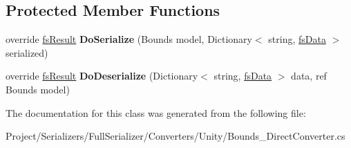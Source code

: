 \subsection*{Protected Member Functions}
\begin{DoxyCompactItemize}
\item 
\mbox{\label{class_full_serializer_1_1_internal_1_1_direct_converters_1_1_bounds___direct_converter_acdba107944e59d9620b06e224c51baf0}} 
override \hyperlink{struct_full_serializer_1_1fs_result}{fs\+Result} {\bfseries Do\+Serialize} (Bounds model, Dictionary$<$ string, \hyperlink{class_full_serializer_1_1fs_data}{fs\+Data} $>$ serialized)
\item 
\mbox{\label{class_full_serializer_1_1_internal_1_1_direct_converters_1_1_bounds___direct_converter_a2d4d2290cff048bd14274876f4814afe}} 
override \hyperlink{struct_full_serializer_1_1fs_result}{fs\+Result} {\bfseries Do\+Deserialize} (Dictionary$<$ string, \hyperlink{class_full_serializer_1_1fs_data}{fs\+Data} $>$ data, ref Bounds model)
\end{DoxyCompactItemize}


The documentation for this class was generated from the following file\+:\begin{DoxyCompactItemize}
\item 
Project/\+Serializers/\+Full\+Serializer/\+Converters/\+Unity/Bounds\+\_\+\+Direct\+Converter.\+cs\end{DoxyCompactItemize}
